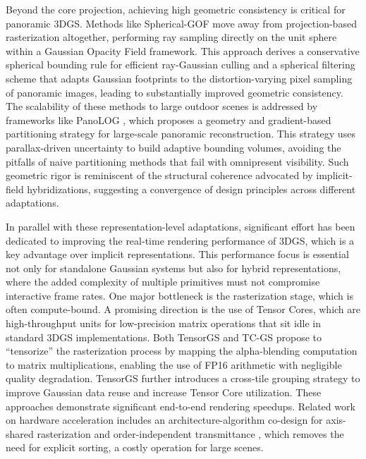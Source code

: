 \documentclass[11pt]{article}
\begin{document}
Beyond the core projection, achieving high geometric consistency is critical for panoramic 3DGS. Methods like Spherical-GOF \cite{ref108} move away from projection-based rasterization altogether, performing ray sampling directly on the unit sphere within a Gaussian Opacity Field framework. This approach derives a conservative spherical bounding rule for efficient ray-Gaussian culling and a spherical filtering scheme that adapts Gaussian footprints to the distortion-varying pixel sampling of panoramic images, leading to substantially improved geometric consistency. The scalability of these methods to large outdoor scenes is addressed by frameworks like PanoLOG \cite{ref109}, which proposes a geometry and gradient-based partitioning strategy for large-scale panoramic reconstruction. This strategy uses parallax-driven uncertainty to build adaptive bounding volumes, avoiding the pitfalls of naive partitioning methods that fail with omnipresent visibility. Such geometric rigor is reminiscent of the structural coherence advocated by implicit-field hybridizations, suggesting a convergence of design principles across different adaptations.

In parallel with these representation-level adaptations, significant effort has been dedicated to improving the real-time rendering performance of 3DGS, which is a key advantage over implicit representations. This performance focus is essential not only for standalone Gaussian systems but also for hybrid representations, where the added complexity of multiple primitives must not compromise interactive frame rates. One major bottleneck is the rasterization stage, which is often compute-bound. A promising direction is the use of Tensor Cores, which are high-throughput units for low-precision matrix operations that sit idle in standard 3DGS implementations. Both TensorGS and TC-GS \cite{ref39,ref110} propose to ``tensorize'' the rasterization process by mapping the alpha-blending computation to matrix multiplications, enabling the use of FP16 arithmetic with negligible quality degradation. TensorGS \cite{ref39} further introduces a cross-tile grouping strategy to improve Gaussian data reuse and increase Tensor Core utilization. These approaches demonstrate significant end-to-end rendering speedups. Related work on hardware acceleration includes an architecture-algorithm co-design for axis-shared rasterization and order-independent transmittance \cite{ref111}, which removes the need for explicit sorting, a costly operation for large scenes.
\end{document}
